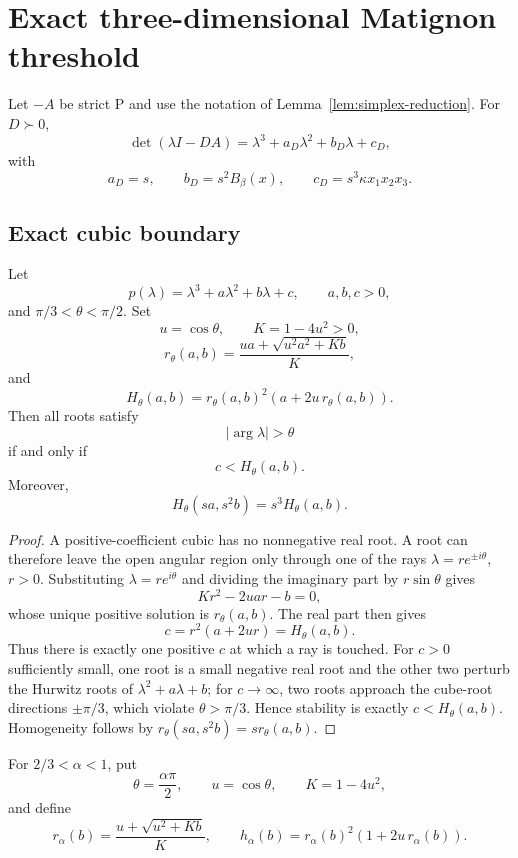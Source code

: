 \section{Exact three-dimensional Matignon threshold}
\label{sec:exact-3x3}

Let \(-A\) be strict P and use the notation of Lemma~\ref{lem:simplex-reduction}. For \(D\succ0\),
\[
\det(\lambda I-DA)
=
\lambda^3+a_D\lambda^2+b_D\lambda+c_D,
\]
with
\[
a_D=s,\qquad
b_D=s^2B_\beta(x),\qquad
c_D=s^3\kappa x_1x_2x_3.
\]

\subsection{Exact cubic boundary}

\begin{lemma}
\label{lem:cubic-boundary}
Let
\[
p(\lambda)=\lambda^3+a\lambda^2+b\lambda+c,
\qquad a,b,c>0,
\]
and \(\pi/3<\theta<\pi/2\). Set
\[
u=\cos\theta,\qquad K=1-4u^2>0,
\]
\[
r_\theta(a,b)
=
\frac{ua+\sqrt{u^2a^2+Kb}}{K},
\]
and
\[
H_\theta(a,b)
=
r_\theta(a,b)^2
\left(a+2u\,r_\theta(a,b)\right).
\]
Then all roots satisfy
\[
|\arg\lambda|>\theta
\]
if and only if
\[
c<H_\theta(a,b).
\]
Moreover,
\[
H_\theta(sa,s^2b)=s^3H_\theta(a,b).
\]
\end{lemma}

\begin{proof}
A positive-coefficient cubic has no nonnegative real root. A root can therefore leave the open angular region only through one of the rays \(\lambda=re^{\pm i\theta}\), \(r>0\). Substituting \(\lambda=re^{i\theta}\) and dividing the imaginary part by \(r\sin\theta\) gives
\[
Kr^2-2uar-b=0,
\]
whose unique positive solution is \(r_\theta(a,b)\). The real part then gives
\[
c=r^2(a+2ur)=H_\theta(a,b).
\]
Thus there is exactly one positive \(c\) at which a ray is touched. For \(c>0\) sufficiently small, one root is a small negative real root and the other two perturb the Hurwitz roots of \(\lambda^2+a\lambda+b\); for \(c\to\infty\), two roots approach the cube-root directions \(\pm\pi/3\), which violate \(\theta>\pi/3\). Hence stability is exactly \(c<H_\theta(a,b)\). Homogeneity follows by \(r_\theta(sa,s^2b)=sr_\theta(a,b)\).
\end{proof}

For \(2/3<\alpha<1\), put
\[
\theta=\frac{\alpha\pi}{2},
\qquad
u=\cos\theta,
\qquad
K=1-4u^2,
\]
and define
\[
r_\alpha(b)
=
\frac{u+\sqrt{u^2+Kb}}{K},
\qquad
h_\alpha(b)
=
r_\alpha(b)^2(1+2u\,r_\alpha(b)).
\]

